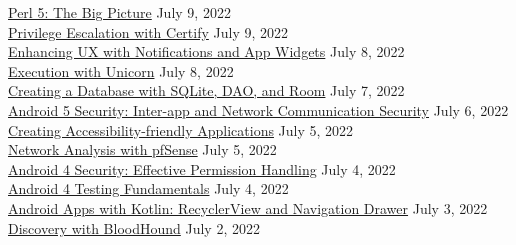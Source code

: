 \documentclass[10pt]{res} %
\begin{document}
\begin{resume}
\href{https://bjdelacruz.dev/files/certificates/pluralsight/Perl_5_The_Big_Picture.pdf}{\color{blue}Perl 5: The Big Picture} \hfill July 9, 2022 \\
\href{https://bjdelacruz.dev/files/certificates/pluralsight/29_Privilege_Escalation_with_Certify.pdf}{\color{blue}Privilege Escalation with Certify} \hfill July 9, 2022 \\
\href{https://bjdelacruz.dev/files/certificates/pluralsight/Enhancing_UX_with_Notifications_and_App_Widgets.pdf}{\color{blue}Enhancing UX with Notifications and App Widgets} \hfill July 8, 2022 \\
\href{https://bjdelacruz.dev/files/certificates/pluralsight/22_Execution_with_Unicorn.pdf}{\color{blue}Execution with Unicorn} \hfill July 8, 2022 \\
\href{https://bjdelacruz.dev/files/certificates/pluralsight/Creating_a_Database_with_SQLite_DAO_and_Room.pdf}{\color{blue}Creating a Database with SQLite, DAO, and Room} \hfill July 7, 2022 \\
\href{https://bjdelacruz.dev/files/certificates/pluralsight/Android_5_Security_Inter_app_and_Network_Communication_Security.pdf}{\color{blue}Android 5 Security: Inter-app and Network Communication Security} \hfill July 6, 2022 \\
\href{https://bjdelacruz.dev/files/certificates/pluralsight/Creating_Accessibility_friendly_Applications.pdf}{\color{blue}Creating Accessibility-friendly Applications} \hfill July 5, 2022 \\
\href{https://bjdelacruz.dev/files/certificates/pluralsight/3_Network_Analysis_with_pfSense.pdf}{\color{blue}Network Analysis with pfSense} \hfill July 5, 2022 \\
\href{https://bjdelacruz.dev/files/certificates/pluralsight/Android_4_Security_Effective_Permission_Handling.pdf}{\color{blue}Android 4 Security: Effective Permission Handling} \hfill July 4, 2022 \\
\href{https://bjdelacruz.dev/files/certificates/pluralsight/Android_4_Testing_Fundamentals.pdf}{\color{blue}Android 4 Testing Fundamentals} \hfill July 4, 2022 \\
\href{https://bjdelacruz.dev/files/certificates/pluralsight/Android_Apps_with_Kotlin_RecyclerView_and_Navigation_Drawer.pdf}{\color{blue}Android Apps with Kotlin: RecyclerView and Navigation Drawer} \hfill July 3, 2022 \\
\href{https://bjdelacruz.dev/files/certificates/pluralsight/41_Discovery_with_BloodHound.pdf}{\color{blue}Discovery with BloodHound} \hfill July 2, 2022 \\

\end{resume}
\end{document}
